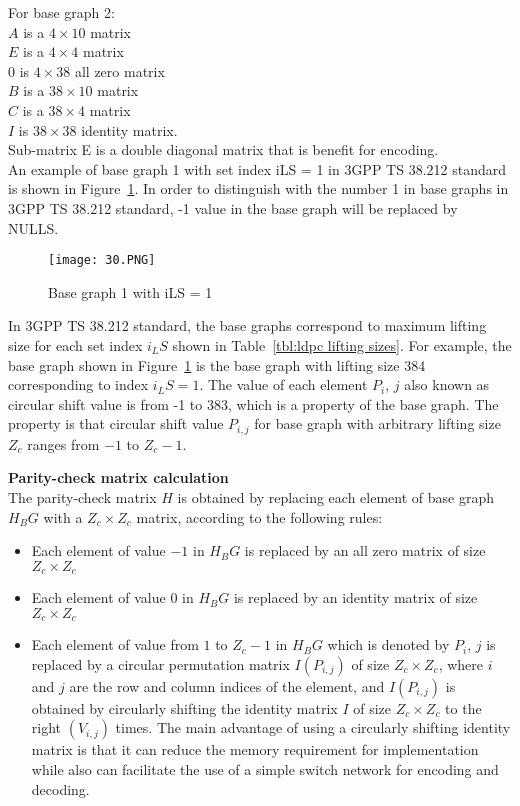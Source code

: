 For base graph 2: \\
$A$ is a $4 \times 10$ matrix \\
$E$ is a $4 \times 4$ matrix \\
$0$ is $4 \times 38$ all zero matrix\\
$B$ is a $38 \times 10$ matrix \\
$C$ is a $38 \times 4$ matrix \\
$I$ is $38 \times 38$ identity matrix. \\

Sub-matrix E is a double diagonal matrix that is benefit for encoding. \\
An example of base graph 1 with set index iLS = 1 in 3GPP TS 38.212 standard is shown in Figure~\ref{fig:standard base graph 1}. In order to distinguish with the number 1 in base graphs in 3GPP TS 38.212 standard, -1 value in the base graph will be replaced by NULLS.

\begin{figure}[h]
\centering
\texttt{[image: 30.PNG]}
\caption{Base graph 1 with iLS = 1}
\label{fig:standard base graph 1}
\end{figure}

In 3GPP TS 38.212 standard, the base graphs correspond to maximum lifting size for each set index $i_LS$ shown in Table~\ref{tbl:ldpc lifting sizes}. For example, the base graph shown in Figure~\ref{fig:standard base graph 1} is the base graph with lifting size 384 corresponding to index $i_LS = 1$. The value of each element $P_i$, $j$ also known as circular shift value is from -1 to 383, which is a property of the base graph. The property is that circular shift value $P_{i,j}$ for base graph with arbitrary lifting size $Z_c$ ranges from $-1$ to $Z_c - 1$.

\textbf{Parity-check matrix calculation} \\
The parity-check matrix $H$ is obtained by replacing each element of base graph $H_BG$ with a $Z_c \times Z_c$ matrix, according to the following rules:
\begin{itemize}
    \item Each element of value $-1$ in $H_BG$ is replaced by an all zero matrix of size $Z_c \times Z_c$
    \item Each element of value $0$ in $H_BG$ is replaced by an identity matrix of size $Z_c \times Z_c$
    \item Each element of value from $1$ to $Z_c - 1$ in $H_BG$ which is denoted by $P_i$, $j$ is replaced by a circular permutation matrix $I$$(P_{i,j})$ of size $Z_c \times Z_c$, where $i$ and $j$ are the row and column indices of the element, and $I$$(P_{i,j})$ is obtained by circularly shifting the identity matrix $I$ of size $Z_c \times Z_c$ to the right $(V_{i,j})$ times. The main advantage of using a circularly shifting identity matrix is that it can reduce the memory requirement for implementation while also can facilitate the use of a simple switch network for encoding and decoding.
\end{itemize}

